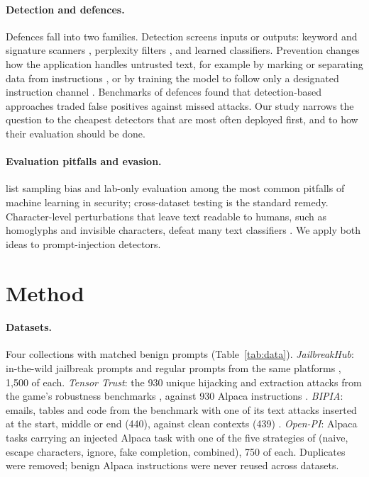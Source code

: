 \documentclass[preprint,12pt,authoryear]{elsarticle}
\begin{document}
\paragraph{Detection and defences.} Defences fall into two families. Detection screens inputs or outputs: keyword and signature
scanners \citep{rebuff,vigil}, perplexity filters \citep{jain2023baseline}, and learned classifiers. Prevention changes how the
application handles untrusted text, for example by marking or separating data from instructions \citep{hines2024spotlighting},
or by training the model to follow only a designated instruction channel \citep{chen2025struq}. Benchmarks of defences
\citep{liu2024formalizing} found that detection-based approaches traded false positives against missed attacks. Our study
narrows the question to the cheapest detectors that are most often deployed first, and to how their evaluation should be done.

\paragraph{Evaluation pitfalls and evasion.} \citet{arp2022dos} list sampling bias and lab-only evaluation among the most common
pitfalls of machine learning in security; cross-dataset testing is the standard remedy. Character-level perturbations that leave
text readable to humans, such as homoglyphs and invisible characters, defeat many text classifiers \citep{boucher2022bad}. We
apply both ideas to prompt-injection detectors.

\section{Method}
\paragraph{Datasets.} Four collections with matched benign prompts (Table~\ref{tab:data}). \emph{JailbreakHub}: in-the-wild
jailbreak prompts and regular prompts from the same platforms \citep{shen2024dan}, 1{,}500 of each. \emph{Tensor Trust}: the
930 unique hijacking and extraction attacks from the game's robustness benchmarks \citep{toyer2024tensortrust}, against 930
Alpaca instructions \citep{taori2023alpaca}. \emph{BIPIA}: emails, tables and code from the benchmark with one of its text attacks
inserted at the start, middle or end (440), against clean contexts (439) \citep{yi2023bipia}. \emph{Open-PI}: Alpaca tasks
carrying an injected Alpaca task with one of the five strategies of \citet{liu2024formalizing} (naive, escape characters, ignore,
fake completion, combined), 750 of each. Duplicates were removed; benign Alpaca instructions were never reused across datasets.
\end{document}
